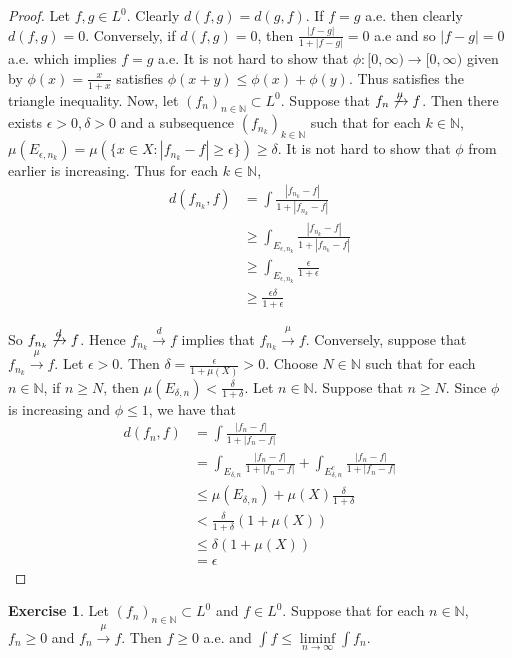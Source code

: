 \documentclass[12pt]{amsart}
\theoremstyle{definition}
\newtheorem{ex}[definition]{Exercise}
\newcommand{\del}{\delta}
\newcommand{\ep}{\epsilon}
\newcommand{\N}{\mathbb{N}}
\newcommand{\Rg}{[0,\infty)}
\newcommand{\limfn}{\liminf \limits_{n \rightarrow \infty}}
\newcommand{\conv}[1]{\xrightarrow{#1}}
\begin{document}
	\begin{proof}
		Let $f,g \in L^0$. Clearly $d(f,g) = d(g,f)$. If $f = g$ a.e. then clearly $d(f,g) = 0$. Conversely, if $d(f,g) = 0$, then $\frac{|f-g|}{1 + |f-g|} = 0$ a.e and so $|f-g| = 0$ a.e. which implies $f =g$ a.e. It is not hard to show that $\phi: \Rg \rightarrow \Rg$ given by $\phi(x) = \frac{x}{1+x}$ satisfies $\phi(x+y) \leq \phi(x)+\phi(y)$. Thus satisfies the triangle inequality. Now, let $(f_n)_{n \in \N} \subset L^0$. Suppose that $f_n \not \conv{\mu} f$. Then there exists $\ep>0, \del>0$ and a subsequence $(f_{n_k})_{k \in \N}$ such that for each $k \in \N$, $\mu(E_{\ep,n_k}) = \mu(\{x \in X: |f_{n_k} - f| \geq \ep\}) \geq \del $. It is not hard to show that $\phi$ from earlier is increasing. Thus for each $k \in \N$, 
		\begin{align*}
			d(f_{n_k},f)
			&= \int \frac{|f_{n_k} -f|}{1+|f_{n_k} -f|}\\
			& \geq \int_{E_{\ep,n_k}} \frac{|f_{n_k} -f|}{1+|f_{n_k} -f|}\\
			& \geq \int_{E_{\ep, n_k}} \frac{\ep}{1+\ep}\\
			& \geq \frac{\ep\del}{1+\ep}
		\end{align*}
		
		So $f_{n_k} \not \conv{d} f$. Hence $f_{n_k} \conv{d} f$ implies that $f_{n_k} \conv{\mu} f$. Conversely, suppose that $f_{n_k} \conv{\mu} f$. Let $\ep >0.$ Then $\del = \frac{\ep}{1+\mu(X)} > 0$. Choose $N \in \N$ such that for each $n \in \N$, if $n \geq N$, then $\mu(E_{\del, n}) < \frac{\del}{1+\del}$. Let $n \in \N$. Suppose that $n \geq N$. Since $\phi$ is increasing and $\phi \leq 1$, we have that 
		\begin{align*}
			d(f_n,f)
			&= \int \frac{|f_n -f|}{1+|f_n -f|}\\
			&= \int_{E_{\del,n}} \frac{|f_n -f|}{1+|f_n -f|} + \int_{E_{\del,n}^c} \frac{|f_n -f|}{1+|f_n -f|}\\
			&\leq \mu(E_{\del,n}) + \mu(X)\frac{\del}{1+\del}\\
			& < \frac{\del}{1+\del}(1+\mu(X))\\
			& \leq \del(1+\mu(X))\\
			& = \ep
		\end{align*}
	\end{proof}
	
	\begin{ex}
		Let $(f_n)_{n \in \N} \subset L^0$ and $f \in L^0$. Suppose that for each $n \in \N$, $f_n \geq 0$ and $f_n \conv{\mu} f$. Then $f \geq 0$ a.e. and $\int f \leq \limfn \int f_n$. 
	\end{ex}
	
\end{document}
